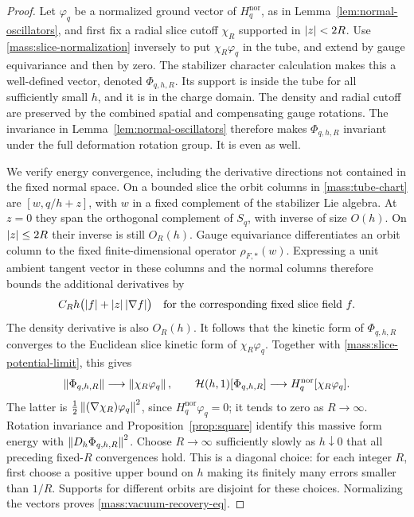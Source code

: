 \begin{proof}
Let \(\varphi_q\) be a normalized ground vector of
\(H_q^{\mathrm{nor}}\), as in
Lemma~\ref{lem:normal-oscillators}, and first fix a radial slice
cutoff \(\chi_R\) supported in \(\left\lvert z\right\rvert<2R\). Use
\eqref{mass:slice-normalization} inversely to put
\(\chi_R\varphi_q\) in the tube, and extend by gauge equivariance
and then by zero. The stabilizer character calculation makes this
a well-defined vector, denoted \(\Phi_{q,h,R}\). Its support is
inside the tube for all sufficiently small \(h\), and it is in
the charge domain. The density and radial cutoff are preserved by
the combined spatial and compensating gauge rotations. The
invariance in Lemma~\ref{lem:normal-oscillators} therefore makes
\(\Phi_{q,h,R}\) invariant under the full deformation rotation
group. It is even as well.

We verify energy convergence, including the derivative directions
not contained in the fixed normal space. On a bounded slice the
orbit columns in \eqref{mass:tube-chart} are
\([w,q/h+z]\), with \(w\) in a fixed complement of the
stabilizer Lie algebra. At \(z=0\) they span the orthogonal
complement of \(S_q\), with inverse of size \(O(h)\). On
\(\left\lvert z\right\rvert\leq2R\) their inverse is still \(O_R(h)\). Gauge
equivariance differentiates an orbit column to the fixed
finite-dimensional operator \(\rho_{F,*}(w)\). Expressing a unit
ambient tangent vector in these columns and the normal columns
therefore bounds the additional derivatives by
\[
 C_Rh\bigl(\left\lvert f\right\rvert+\left\lvert z\right\rvert\left\lvert \nabla f\right\rvert\bigr)
 \quad\text{for the corresponding fixed slice field }f.
\]
The density derivative is also \(O_R(h)\). It follows that the
kinetic form of \(\Phi_{q,h,R}\) converges to the Euclidean
slice kinetic form of \(\chi_R\varphi_q\). Together with
\eqref{mass:slice-potential-limit}, this gives
\[
 \left\lVert \Phi_{q,h,R}\right\rVert\longrightarrow\left\lVert \chi_R\varphi_q\right\rVert,\qquad
 \mathcal H(h,1)[\Phi_{q,h,R}]
 \longrightarrow H_q^{\mathrm{nor}}[\chi_R\varphi_q].
\]
The latter is
\(\frac12\left\lVert (\nabla\chi_R)\varphi_q\right\rVert^2\), since
\(H_q^{\mathrm{nor}}\varphi_q=0\); it tends to zero as
\(R\to\infty\). Rotation invariance and
Proposition~\ref{prop:square} identify this massive form energy
with \(\left\lVert D_h\Phi_{q,h,R}\right\rVert^2\). Choose \(R\to\infty\)
sufficiently slowly as \(h\downarrow0\) that all preceding
fixed-\(R\) convergences hold. This is a diagonal choice: for each
integer \(R\), first choose a positive upper bound on \(h\)
making its finitely many errors smaller than \(1/R\). Supports for
different orbits are disjoint for these choices. Normalizing the
vectors proves \eqref{mass:vacuum-recovery-eq}.
\end{proof}

